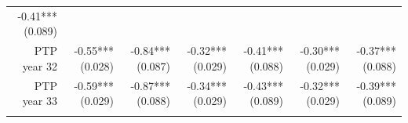 \documentclass[]{article}
\begin{document}
\begin{longtable}[c]{@{}rrrrrrr@{}}
\begin{minipage}[t]{0.11\columnwidth}
-0.41*** (0.089)
\strut\end{minipage}\tabularnewline
\begin{minipage}[t]{0.12\columnwidth}\raggedleft\strut
PTP year 32
\strut\end{minipage} &
\begin{minipage}[t]{0.11\columnwidth}\raggedleft\strut
-0.55*** (0.028)
\strut\end{minipage} &
\begin{minipage}[t]{0.12\columnwidth}\raggedleft\strut
-0.84*** (0.087)
\strut\end{minipage} &
\begin{minipage}[t]{0.11\columnwidth}\raggedleft\strut
-0.32*** (0.029)
\strut\end{minipage} &
\begin{minipage}[t]{0.12\columnwidth}\raggedleft\strut
-0.41*** (0.088)
\strut\end{minipage} &
\begin{minipage}[t]{0.11\columnwidth}\raggedleft\strut
-0.30*** (0.029)
\strut\end{minipage} &
\begin{minipage}[t]{0.11\columnwidth}\raggedleft\strut
-0.37*** (0.088)
\strut\end{minipage}\tabularnewline
\begin{minipage}[t]{0.12\columnwidth}\raggedleft\strut
PTP year 33
\strut\end{minipage} &
\begin{minipage}[t]{0.11\columnwidth}\raggedleft\strut
-0.59*** (0.029)
\strut\end{minipage} &
\begin{minipage}[t]{0.12\columnwidth}\raggedleft\strut
-0.87*** (0.088)
\strut\end{minipage} &
\begin{minipage}[t]{0.11\columnwidth}\raggedleft\strut
-0.34*** (0.029)
\strut\end{minipage} &
\begin{minipage}[t]{0.12\columnwidth}\raggedleft\strut
-0.43*** (0.089)
\strut\end{minipage} &
\begin{minipage}[t]{0.11\columnwidth}\raggedleft\strut
-0.32*** (0.029)
\strut\end{minipage} &
\begin{minipage}[t]{0.11\columnwidth}\raggedleft\strut
-0.39*** (0.089)
\strut\end{minipage}\tabularnewline
\begin{minipage}[t]{0.12\columnwidth}\raggedleft\strut

\end{minipage}
\end{longtable}
\end{document}
